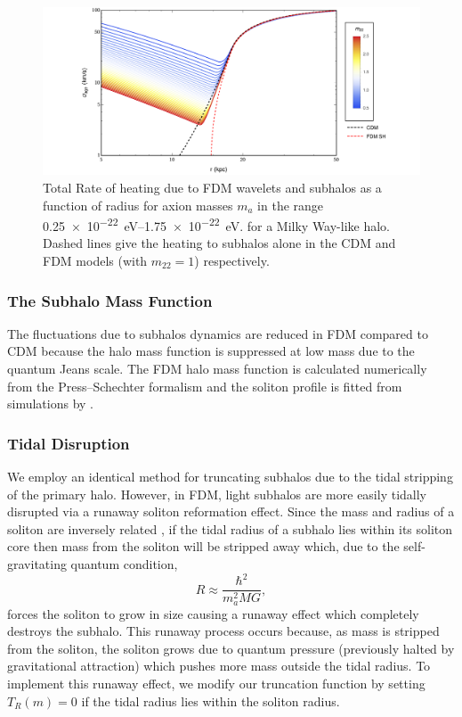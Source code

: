 \documentclass[usenatbib]{mnras}
\begin{document}
\begin{figure}
\includegraphics[width=17cm]{FDM_velocity}
\caption{Total Rate of heating due to FDM wavelets and subhalos as a function of radius for axion masses $m_{a}$ in the range \SIrange{0.25 e-22}{ 1.75 e-22}{\electronvolt}. for a Milky Way-like halo. Dashed lines give the heating to subhalos alone in the CDM and FDM models (with $m_{22} = 1$) respectively.}
\label{fig:radiusheating}
\end{figure}



\subsubsection{The Subhalo Mass Function}

The fluctuations due to subhalos dynamics are reduced in FDM compared to CDM because the halo mass function is suppressed at low mass due to the quantum Jeans scale. The FDM halo mass function is calculated numerically from the Press--Schechter formalism \citep{substructure_FDM, marsh} and the soliton profile is fitted from simulations by \cite{schive_solitons}. 



\subsubsection{Tidal Disruption}

 
We employ an identical method for truncating subhalos due to the tidal stripping of the primary halo. However, in FDM, light subhalos are more easily tidally disrupted via a runaway soliton reformation effect. Since the mass and radius of a soliton are inversely related \citep{solitons}, if the tidal radius of a subhalo lies within its soliton core then mass from the soliton will be stripped away which, due to the self-gravitating quantum condition,
\begin{equation}
R \approx \frac{\hbar^2}{m_a^2 M G},
\end{equation} 
forces the soliton to grow in size causing a runaway effect which completely destroys the subhalo. This runaway process occurs because, as mass is stripped from the soliton, the soliton grows due to quantum pressure (previously halted by gravitational attraction) which pushes more mass outside the tidal radius. To implement this runaway effect, we modify our truncation function by setting $T_R(m) = 0$ if the tidal radius lies within the soliton radius. 
\end{document}
